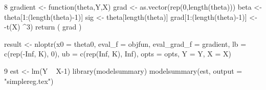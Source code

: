 \documentclass{article}
\begin{document}
8
gradient <- function(theta,Y,X) {
  grad <- as.vector(rep(0,length(theta)))
  beta <- theta[1:(length(theta)-1)]
  sig <- theta[length(theta)]
  grad[1:(length(theta)-1)] <- -t(X)%
                                                                                                                            ^3)
  return ( grad ) }

result <- nloptr(x0 = theta0, eval_f = objfun, eval_grad_f = gradient, 
                 lb = c(rep(-Inf, K), 0), ub = c(rep(Inf, K), Inf), 
                 opts = opts, Y = Y, X = X)

9
est <- lm(Y ~ X-1)
library(modelsummary)
modelsummary(est, output = "simplereg.tex")
\end{document}
